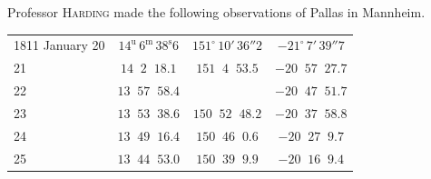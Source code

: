 \par\indent Professor \textsc{Harding} made the following observations of Pallas in Mannheim.
\begin{center}\fontsize{10}{12}\selectfont\setlength{\tabcolsep}{4pt}\renewcommand{\arraystretch}{1.15}
\begin{tabular}{l|c|c|c}
1811 January 20 & $14^{\mathrm u}\,6^{\mathrm m}\,38^{\mathrm s}6$ & $151^\circ\,10'\,36''2$ & $-21^\circ\,7'\,39''7$ \\
\phantom{1811 January }21 & $14\;\;2\;\;18.1$ & $151\;\;4\;\;53.5$ & $-20\;\;57\;\;27.7$ \\
\phantom{1811 January }22 & $13\;\;57\;\;58.4$ & & $-20\;\;47\;\;51.7$ \\
\phantom{1811 January }23 & $13\;\;53\;\;38.6$ & $150\;\;52\;\;48.2$ & $-20\;\;37\;\;58.8$ \\
\phantom{1811 January }24 & $13\;\;49\;\;16.4$ & $150\;\;46\;\;0.6$ & $-20\;\;27\;\;9.7$ \\
\phantom{1811 January }25 & $13\;\;44\;\;53.0$ & $150\;\;39\;\;9.9$ & $-20\;\;16\;\;9.4$ \\
\end{tabular}
\end{center}


